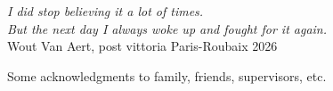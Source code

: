 \begin{flushright}
{ \textit{I did stop believing it a lot of times. \\ But the next day I always woke up and fought for it again.} \\
\vspace{10pt}
Wout Van Aert, post vittoria Paris-Roubaix 2026
}
\end{flushright}

\vspace{13pt}

Some acknowledgments to family, friends, supervisors, etc.

\thispagestyle{empty}
\mbox{}
\newpage